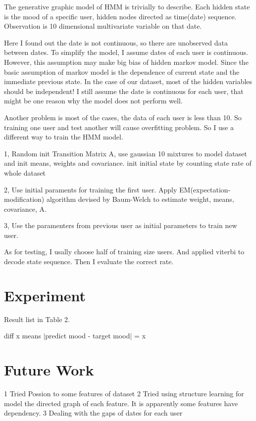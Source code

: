 \documentclass{article}
\begin{document}
The generative graphic model of HMM is trivially to describe. Each hidden state is the mood of a specific user, hidden nodes directed as time(date) sequence. Observation is 10 dimensional multivariate variable on that date. 

Here I found out the date is not continuous, so there are unobserved data between dates. To simplify the model, I assume dates of each user is continuous. However, this assumption may make big bias of hidden markov model. Since the basic assumption of markov model is the dependence of current state and the immediate previous state. In the  case of our dataset, most of the hidden variables should be independent! I still assume the date is continuous for each user, that might be one reason why the model does not perform well.

Another problem is most of the cases, the data of each user is less than 10. So training one user and test another will cause overfitting problem. So I use a different way to train the HMM model.

1, Random init Transition Matrix A, use gaussian 10 mixtures to model dataset and init means, weights and covariance. init initial state by counting state rate of whole dataset

2, Use initial paraments for training the first user. Apply EM(expectation-modification) algorithm devised by Baum-Welch to estimate weight, means, covariance, A. 

3, Use the paramenters from previous user as initial parameters to train new user.

As for testing, I usally choose half of training size users. And applied viterbi to decode state sequence. Then I evaluate the correct rate.

\section{Experiment}

Result list in Table 2.
\begin{table}
\begin{center}
\caption{Correct rate}
 \begin{footnotesize}
diff x means $|$predict mood - target mood$|$ = x 
\end{footnotesize}
\end{center}
\end{table}

\section{Future Work}
1 Tried Possion to some features of dataset
2 Tried using structure learning for model the directed graph of each feature. It is apparently some features have dependency.
3 Dealing with the gaps of dates for each user

   
\end{document}
